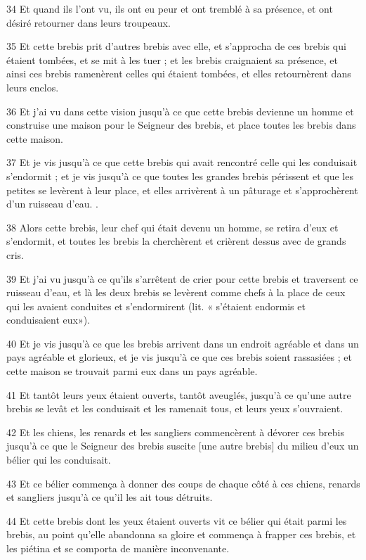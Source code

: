 \par 34 Et quand ils l'ont vu, ils ont eu peur et ont tremblé à sa présence, et ont désiré retourner dans leurs troupeaux.
\par 35 Et cette brebis prit d'autres brebis avec elle, et s'approcha de ces brebis qui étaient tombées, et se mit à les tuer ; et les brebis craignaient sa présence, et ainsi ces brebis ramenèrent celles qui étaient tombées, et elles retournèrent dans leurs enclos.
\par 36 Et j'ai vu dans cette vision jusqu'à ce que cette brebis devienne un homme et construise une maison pour le Seigneur des brebis, et place toutes les brebis dans cette maison.
\par 37 Et je vis jusqu'à ce que cette brebis qui avait rencontré celle qui les conduisait s'endormit ; ​​et je vis jusqu'à ce que toutes les grandes brebis périssent et que les petites se levèrent à leur place, et elles arrivèrent à un pâturage et s'approchèrent d'un ruisseau d'eau. .
\par 38 Alors cette brebis, leur chef qui était devenu un homme, se retira d'eux et s'endormit, et toutes les brebis la cherchèrent et crièrent dessus avec de grands cris.
\par 39 Et j'ai vu jusqu'à ce qu'ils s'arrêtent de crier pour cette brebis et traversent ce ruisseau d'eau, et là les deux brebis se levèrent comme chefs à la place de ceux qui les avaient conduites et s'endormirent (lit. « s'étaient endormis et conduisaient eux»).
\par 40 Et je vis jusqu'à ce que les brebis arrivent dans un endroit agréable et dans un pays agréable et glorieux, et je vis jusqu'à ce que ces brebis soient rassasiées ; et cette maison se trouvait parmi eux dans un pays agréable.
\par 41 Et tantôt leurs yeux étaient ouverts, tantôt aveuglés, jusqu'à ce qu'une autre brebis se levât et les conduisait et les ramenait tous, et leurs yeux s'ouvraient.
\par 42 Et les chiens, les renards et les sangliers commencèrent à dévorer ces brebis jusqu'à ce que le Seigneur des brebis suscite [une autre brebis] du milieu d'eux un bélier qui les conduisait.
\par 43 Et ce bélier commença à donner des coups de chaque côté à ces chiens, renards et sangliers jusqu'à ce qu'il les ait tous détruits.
\par 44 Et cette brebis dont les yeux étaient ouverts vit ce bélier qui était parmi les brebis, au point qu'elle abandonna sa gloire et commença à frapper ces brebis, et les piétina et se comporta de manière inconvenante.
